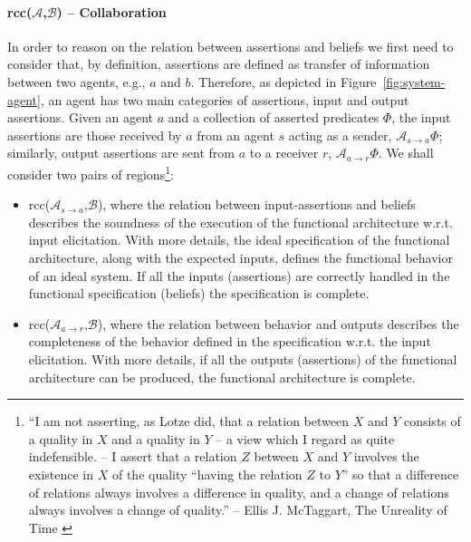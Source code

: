 \documentclass[conference]{IEEEtran}
\newcommand{\assertionRegion}{\mathcal{A}}
\newcommand{\beliefRegion}{\mathcal{B}}
\newcommand{\Rcc}[2]{rcc(#1,#2)}
\newcommand{\rassert}[3]{\mathcal{A}_{#1\rightarrow #2}#3}
\begin{document}
\paragraph{\Rcc{$\assertionRegion$}{$\beliefRegion$} -- Collaboration} In order
to reason on the relation between assertions and beliefs we first need to
consider that, by definition, assertions are defined as transfer of information
between two agents, e.g., $a$ and $b$.  Therefore, as depicted in
Figure~\ref{fig:system-agent}, an agent has two main categories of assertions,
input and output assertions.  Given an agent $a$ and a collection of asserted
predicates $\Phi$, the input assertions are those received by $a$ from an agent
$s$ acting as a sender, $\rassert{s}{a}{\Phi}$; similarly, output assertions
are sent from $a$ to a receiver $r$, $\rassert{a}{r}{\Phi}$. We shall consider
two pairs of regions\footnote{``I am not asserting, as Lotze did, that a
relation between $X$ and $Y$ consists of a quality in $X$ and a quality in $Y$
-- a view which I regard as quite indefensible. -- I assert that a relation $Z$
between $X$ and $Y$ involves the existence in $X$ of the quality ``having the
relation $Z$ to $Y$'' so that a difference of relations always involves a
difference in quality, and a change of relations always involves a change of
quality.'' --  Ellis J. McTaggart, The Unreality of
Time \autocite{Mctaggart1908unreality}}: 
\begin{itemize}
	\item \Rcc{$\assertionRegion_{s\rightarrow a}$}{$\beliefRegion$},
		where the relation between input-assertions and beliefs
		describes the soundness of the execution of the functional
		architecture w.r.t. input elicitation. With more details, the
		ideal specification of the functional architecture, along with
		the expected inputs, defines the functional behavior of an
		ideal system.  If all the inputs (assertions) are correctly
		handled in the functional specification (beliefs) the
		specification is complete. 

	\item \Rcc{$\assertionRegion_{a\rightarrow r}$}{$\beliefRegion$},
		where the relation between behavior and outputs describes the
		completeness of the behavior defined in the specification
		w.r.t. the input elicitation.  With more details, if all the
		outputs (assertions) of the functional architecture can be
		produced, the functional architecture is complete.
\end{itemize}
\end{document}
